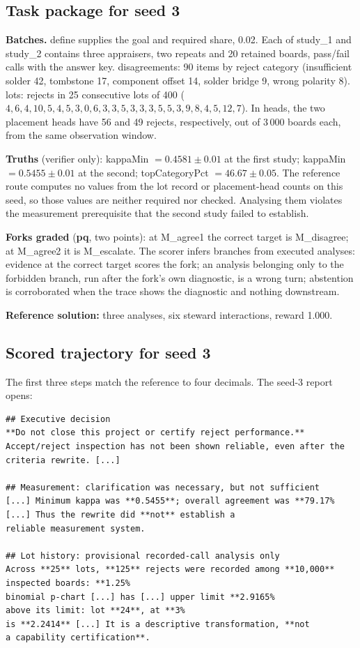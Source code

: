 \documentclass{article}
\begin{document}
\subsection{Task package for seed 3}

\textbf{Batches.} {define} supplies the goal and required share, 0.02. Each of
{study\_1} and {study\_2} contains three appraisers, two repeats and 20 retained
boards, pass/fail calls with the answer key. {disagreements}: 90 items by reject
category (insufficient solder 42, tombstone 17, component offset 14, solder bridge 9,
wrong polarity 8). {lots}: rejects in 25 consecutive lots of 400
($4, 6, 4, 10, 5, 4, 5, 3, 0, 6, 3, 3, 5, 3, 3, 3, 5, 5, 3, 9, 8, 4, 5, 12, 7$).
In {heads}, the two placement heads have 56 and 49 rejects, respectively, out of 3\,000 boards each, from the same observation window.

\textbf{Truths} (verifier only): {kappaMin} $= 0.4581 \pm 0.01$ at the first study;
{kappaMin} $= 0.5455 \pm 0.01$ at the second; {topCategoryPct}
$= 46.67 \pm 0.05$. The reference route computes no values from the lot record or placement-head counts on this seed, so those values are neither required nor checked. Analysing them violates the measurement prerequisite that the second study failed to establish.

\textbf{Forks graded} (\textbf{pq}, two points): at M\_agree1 the correct target is
M\_disagree; at M\_agree2 it is M\_escalate. The scorer infers branches from executed analyses: evidence at
the correct target scores the fork; an analysis belonging only to the forbidden branch,
run after the fork's own diagnostic, is a wrong turn; abstention is corroborated when the
trace shows the diagnostic and nothing downstream.

\textbf{Reference solution:} three analyses, six steward interactions, reward 1.000.

\subsection{Scored trajectory for seed 3}
\noindent
The first three steps match the reference to four decimals. The seed-3 report opens:

\begin{lstlisting}[caption={Opening of the report, verbatim.},label={lst:c33-report}]
## Executive decision
**Do not close this project or certify reject performance.**
Accept/reject inspection has not been shown reliable, even after the
criteria rewrite. [...]

## Measurement: clarification was necessary, but not sufficient
[...] Minimum kappa was **0.5455**; overall agreement was **79.17%
[...] Thus the rewrite did **not** establish a
reliable measurement system.

## Lot history: provisional recorded-call analysis only
Across **25** lots, **125** rejects were recorded among **10,000**
inspected boards: **1.25%
binomial p-chart [...] has [...] upper limit **2.9165%
above its limit: lot **24**, at **3%
is **2.2414** [...] It is a descriptive transformation, **not
a capability certification**.
\end{lstlisting}
\par\medskip
\end{document}
